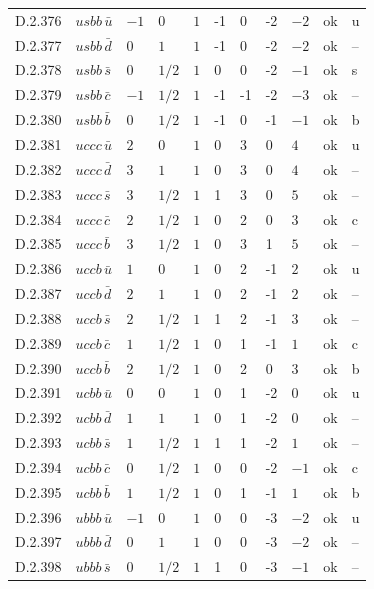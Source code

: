 {\begin{longtable}{@{}llllllllll>{\raggedright\arraybackslash}p{2.0cm}@{}}
D.2.376 & $usbb\,\bar{u}$ & $-1$ & $0$ & $1$ & -1 & 0 & -2 & $-2$ & ok & u \\
D.2.377 & $usbb\,\bar{d}$ & $0$ & $1$ & $1$ & -1 & 0 & -2 & $-2$ & ok & -- \\
D.2.378 & $usbb\,\bar{s}$ & $0$ & $1/2$ & $1$ & 0 & 0 & -2 & $-1$ & ok & s \\
D.2.379 & $usbb\,\bar{c}$ & $-1$ & $1/2$ & $1$ & -1 & -1 & -2 & $-3$ & ok & -- \\
D.2.380 & $usbb\,\bar{b}$ & $0$ & $1/2$ & $1$ & -1 & 0 & -1 & $-1$ & ok & b \\
D.2.381 & $uccc\,\bar{u}$ & $2$ & $0$ & $1$ & 0 & 3 & 0 & $4$ & ok & u \\
D.2.382 & $uccc\,\bar{d}$ & $3$ & $1$ & $1$ & 0 & 3 & 0 & $4$ & ok & -- \\
D.2.383 & $uccc\,\bar{s}$ & $3$ & $1/2$ & $1$ & 1 & 3 & 0 & $5$ & ok & -- \\
D.2.384 & $uccc\,\bar{c}$ & $2$ & $1/2$ & $1$ & 0 & 2 & 0 & $3$ & ok & c \\
D.2.385 & $uccc\,\bar{b}$ & $3$ & $1/2$ & $1$ & 0 & 3 & 1 & $5$ & ok & -- \\
D.2.386 & $uccb\,\bar{u}$ & $1$ & $0$ & $1$ & 0 & 2 & -1 & $2$ & ok & u \\
D.2.387 & $uccb\,\bar{d}$ & $2$ & $1$ & $1$ & 0 & 2 & -1 & $2$ & ok & -- \\
D.2.388 & $uccb\,\bar{s}$ & $2$ & $1/2$ & $1$ & 1 & 2 & -1 & $3$ & ok & -- \\
D.2.389 & $uccb\,\bar{c}$ & $1$ & $1/2$ & $1$ & 0 & 1 & -1 & $1$ & ok & c \\
D.2.390 & $uccb\,\bar{b}$ & $2$ & $1/2$ & $1$ & 0 & 2 & 0 & $3$ & ok & b \\
D.2.391 & $ucbb\,\bar{u}$ & $0$ & $0$ & $1$ & 0 & 1 & -2 & $0$ & ok & u \\
D.2.392 & $ucbb\,\bar{d}$ & $1$ & $1$ & $1$ & 0 & 1 & -2 & $0$ & ok & -- \\
D.2.393 & $ucbb\,\bar{s}$ & $1$ & $1/2$ & $1$ & 1 & 1 & -2 & $1$ & ok & -- \\
D.2.394 & $ucbb\,\bar{c}$ & $0$ & $1/2$ & $1$ & 0 & 0 & -2 & $-1$ & ok & c \\
D.2.395 & $ucbb\,\bar{b}$ & $1$ & $1/2$ & $1$ & 0 & 1 & -1 & $1$ & ok & b \\
D.2.396 & $ubbb\,\bar{u}$ & $-1$ & $0$ & $1$ & 0 & 0 & -3 & $-2$ & ok & u \\
D.2.397 & $ubbb\,\bar{d}$ & $0$ & $1$ & $1$ & 0 & 0 & -3 & $-2$ & ok & -- \\
D.2.398 & $ubbb\,\bar{s}$ & $0$ & $1/2$ & $1$ & 1 & 0 & -3 & $-1$ & ok & -- \\

\end{longtable}}
